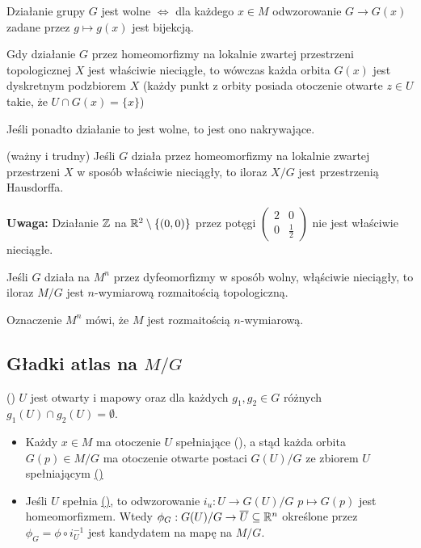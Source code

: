 \begin{fact}
Działanie grupy $G$ jest wolne $\iff$ dla każdego $x\in M$ odwzorowanie $G\to G(x)$ zadane przez $g\mapsto g(x)$ jest bijekcją.
\end{fact}

\begin{fact}
Gdy działanie $G$ przez homeomorfizmy na lokalnie zwartej przestrzeni topologicznej $X$ jest właściwie nieciągłe, to wówczas każda orbita $G(x)$ jest dyskretnym podzbiorem $X$ (każdy punkt z orbity posiada otoczenie otwarte $z\in U$ takie, że $U\cap G(x)=\{x\}$)
\end{fact}

Jeśli ponadto działanie to jest wolne, to jest ono nakrywające.

\begin{fact}(ważny i trudny) 
Jeśli $G$ działa przez homeomorfizmy na lokalnie zwartej przestrzeni $X$ w sposób właściwie nieciągły, to iloraz $X/G$ jest przestrzenią Hausdorffa.
\end{fact}

\textbf{Uwaga:} Działanie $\mathbb{Z}$ na $\mathbb{R}^2\setminus\{(0,0)\}$ przez potęgi $\begin{pmatrix}2&0\\0&\frac{1}{2}\end{pmatrix}$ nie jest właściwie nieciągłe. 

\begin{fact}
Jeśli $G$ działa na $M^n$ przez dyfeomorfizmy w sposób wolny, włąściwie nieciągły, to iloraz $M/G$ jest $n$-wymiarową rozmaitością topologiczną.
\end{fact}

Oznaczenie $M^n$ mówi, że $M$ jest rozmaitością $n$-wymiarową.

\subsection{Gładki atlas na $M/G$}

\label{gw:5:2:1}
\begin{bbox}
(\Coffeecup) $U$ jest otwarty i mapowy oraz dla każdych $g_1,g_2\in G$ różnych $g_1(U)\cap g_2(U)=\emptyset$.
\end{bbox}
\begin{itemize}
    \item[\PHtunny] Każdy $x\in M$ ma otoczenie $U$ spełniające (\Coffeecup), a stąd każda orbita $G(p)\in M/G$ ma otoczenie otwarte postaci $G(U)/G$ ze zbiorem $U$ spełniającym \hyperref[gw:5:2:1]{(\Coffeecup)}
    \item[\PHtunny] Jeśli $U$ spełnia \hyperref[gw:5:2:1]{(\Coffeecup)}, to odwzorowanie $i_u:U\to G(U)/G$ $p\mapsto G(p)$ jest homeomorfizmem. Wtedy $\phi_G:G(U)/G\to\overline{U}\subseteq\mathbb{R}^n$ określone przez $\phi_G=\phi\circ i_U^{-1}$ jest kandydatem na mapę na $M/G$.
\end{itemize}

